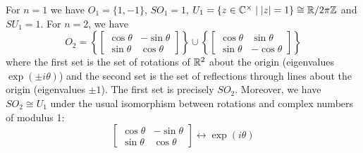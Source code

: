 \begin{exam}
  For $n=1$ we have $O_1=\{1,-1\}$, $SO_1=1$, $U_1=\{z \in \mathbb{C}^\times \mid \left\lvert z \right\rvert=1\} \cong \mathbb{R}/2\pi\mathbb{Z}$ and $SU_1=1$.
  For $n=2$, we have
  \[O_2=
    \left\{ 
      \begin{bmatrix}
	\cos\theta & -\sin\theta \\ \sin\theta & \cos\theta
      \end{bmatrix}
    \right\}
    \cup
    \left\{ 
      \begin{bmatrix}
	\cos\theta & \sin\theta \\ \sin\theta & -\cos\theta
      \end{bmatrix}
  \right\}\]
  where the first set is the set of rotations of $\mathbb{R}^2$ about the origin (eigenvalues $\exp(\pm i\theta)$) and the second set is the set of reflections through lines about the origin (eigenvalues $\pm 1$).
  The first set is precisely $SO_2$.
  Moreover, we have $SO_2 \cong U_1$ under the usual isomorphism between rotations and complex numbers of modulus 1:
  \[
    \begin{bmatrix}
      \cos\theta & -\sin\theta \\ \sin\theta & \cos\theta
    \end{bmatrix}
    \longleftrightarrow
    \exp(i\theta)
  \]
\end{exam}

